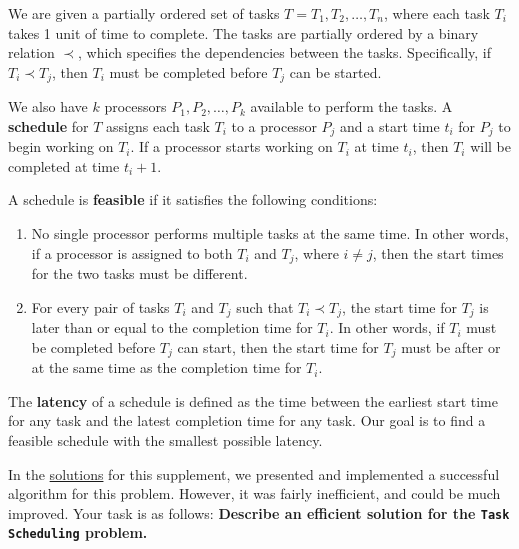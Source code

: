 \documentclass{article}
\begin{document}
    \begin{tcolorbox}[
    enhanced, colback={green!40!black}, colupper=white, colframe=brown!70!black,
    sharp corners,drop fuzzy shadow,
    underlay={\tcbvignette{size=2mm, inside node=frame, raised color=brown!70!black}}]
    {
        \vspace{2mm} We are given a partially ordered set of tasks $T = {T_{1}, T_{2}, \dots, T_{n}}$, where each task $T_{i}$ takes 1 unit of time to complete. The tasks are partially ordered by a binary relation $\prec$, which specifies the dependencies between the tasks. Specifically, if $T_{i} \prec T_{j}$, then $T_{i}$ must be completed before $T_{j}$ can be started.
    
        \vspace{3mm}
        We also have $k$ processors $P_{1}, P_{2}, \dots, P_{k}$ available to perform the tasks. A \textbf{schedule} for $T$ assigns each task $T_{i}$ to a processor $P_{j}$ and a start time $t_{i}$ for $P_{j}$ to begin working on $T_{i}$. If a processor starts working on $T_{i}$ at time $t_{i}$, then $T_{i}$ will be completed at time $t_{i} + 1$.
    
        \vspace{3mm} A schedule is \textbf{feasible} if it satisfies the following conditions:
        \begin{enumerate}[label = \arabic*]
            \item No single processor performs multiple tasks at the same time. In other words, if a processor is assigned to both $T_{i}$ and $T_{j}$, where $i \ne j$, then the start times for the two tasks must be different.
            \item For every pair of tasks $T_{i}$ and $T_{j}$ such that $T_{i} \prec T_{j}$, the start time for $T_{j}$ is later than or equal to the completion time for $T_{i}$. In other words, if $T_{i}$ must be completed before $T_{j}$ can start, then the start time for $T_{j}$ must be after or at the same time as the completion time for $T_{i}$.
        \end{enumerate}
        The \textbf{latency} of a schedule is defined as the time between the earliest start time for any task and the latest completion time for any task. Our goal is to find a feasible schedule with the smallest possible latency.
        }
    \end{tcolorbox}
    
    In the \href{https://github.com/sar-mo/CS2051-HonorsDiscreteMath/blob/main/sp23/hw-supplements/hw5-supp-slns/generate_schedule_sln.pdf}{solutions} for this supplement, we presented and implemented a successful algorithm for this problem. However, it was fairly inefficient, and could be much improved. Your task is as follows: \textbf{Describe an efficient solution for the \texttt{Task} \texttt{Scheduling} problem.}
\end{document}
